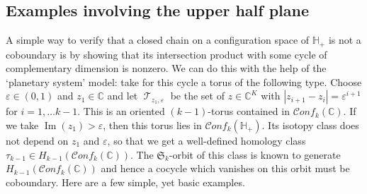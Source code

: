 \documentclass[12pt,letterpaper]{amsart}
\numberwithin{equation}{section}
\def\CC{{\mathbb C}}
\def\HH{{\mathbb H}}
\def\Sfrak{\mathfrak{S}}
\newcommand\conf{\mathscr{C}\!\mathit{onf}\!}
\newcommand\im{\operatorname{Im}}
\newcommand\Tcal{\operatorname{{\mathcal T}}}
\theoremstyle{remark}
\begin{document}
\subsection{Examples involving the  upper half plane} A simple way to  verify that a closed chain on a configuration space of $\HH_+$  is not a coboundary is by showing that its intersection product with some cycle of complementary dimension is nonzero. 
We can do this with the help of the `planetary system' model:  take for this cycle  a torus of the following type. Choose $\varepsilon\in (0,1)$ and $z_1\in \CC$ and let  $\Tcal_{z_1,\varepsilon}$ be the set of $z\in \CC^K$ with 
$|z_{i+1}-z_i|=\varepsilon^{i+1}$ for   $i=1,\dots k-1$. This is an oriented $(k-1)$-torus contained in 
$\conf_k(\CC)$.  If we take $\im (z_1)>\varepsilon$,  then this torus lies in  $\conf_k(\HH_+)$. Its   isotopy class does not depend  on $z_1$ and $\varepsilon$, so that we  get a well-defined homology class $\tau_{k-1}\in H_{k-1}(\conf_k(\CC))$. The $\Sfrak_k$-orbit of this class is  known to generate  $H_{k-1}(\conf_k(\CC))$ and hence a cocycle which vanishes on this orbit must be coboundary.
Here are a few simple, yet  basic  examples. 
\end{document}
